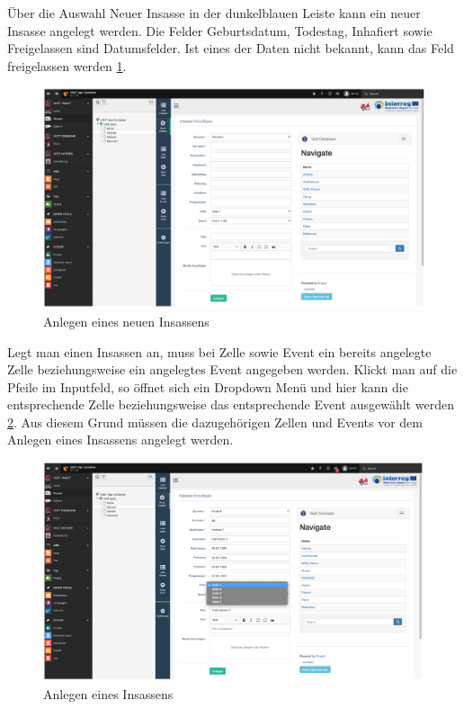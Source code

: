 Über die Auswahl Neuer Insasse in der dunkelblauen Leiste kann ein neuer Insasse angelegt werden. Die Felder Geburtsdatum, Todestag, Inhafiert sowie Freigelassen sind Datumsfelder. Ist eines der Daten nicht bekannt, kann das Feld freigelassen werden \ref{img:anlegen_insassen}.
\begin{figure}[ht!]
\centering
\includegraphics[width=12cm]{Figures/paula/glossar/anlegen_insassen.png}
\caption{Anlegen eines neuen Insassens}
\label{img:anlegen_insassen}
\end{figure}
Legt man einen Insassen an, muss bei Zelle sowie Event ein bereits angelegte Zelle beziehungsweise ein angelegtes Event angegeben werden. Klickt man auf die Pfeile im Inputfeld, so öffnet sich ein Dropdown Menü und hier kann die entsprechende Zelle beziehungsweise das entsprechende Event ausgewählt werden \ref{img:anlegen_insassen_auswahl}. Aus diesem Grund müssen die dazugehörigen Zellen und Events vor dem Anlegen eines Insassens angelegt werden.
\begin{figure}[ht!]
\centering
\includegraphics[width=12cm]{Figures/paula/glossar/anlegen_insassen_auswahl.png}
\caption{Anlegen eines Insassens}
\label{img:anlegen_insassen_auswahl}
\end{figure}
